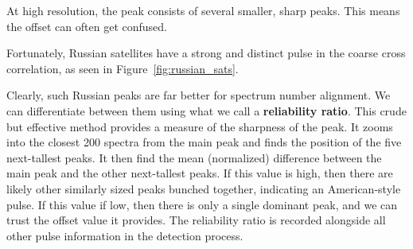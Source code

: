 At high resolution, the peak consists of several smaller, sharp peaks. This means the offset can often get confused.

Fortunately, Russian satellites have a strong and distinct pulse in the coarse cross correlation, as seen in Figure~\ref{fig:russian_sats}.


 
Clearly, such Russian peaks are far better for spectrum number alignment.
We can differentiate between them using what we call a \textbf{reliability ratio}.
This crude but effective method provides a measure of the sharpness of the peak.
It zooms into the closest 200 spectra from the main peak and finds the position of the five next-tallest peaks.
It then find the mean (normalized) difference between the main peak and the other next-tallest peaks.
If this value is high, then there are likely other similarly sized peaks bunched together, indicating an American-style pulse.
If this value if low, then there is only a single dominant peak, and we can trust the offset value it provides.
The reliability ratio is recorded alongside all other pulse information in the detection process.





